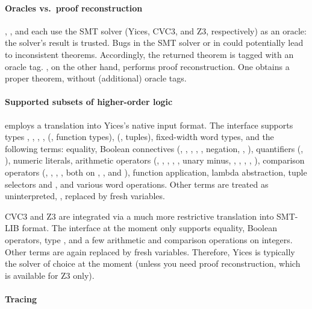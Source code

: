 \paragraph{Oracles vs.\ proof reconstruction}

, , and  each use the
SMT solver (Yices, CVC3, and Z3, respectively) as an oracle: the
solver's result is trusted.  Bugs in the SMT solver or in
 could potentially lead to inconsistent theorems.
Accordingly, the returned theorem is tagged with an oracle
tag. , on the other hand, performs proof reconstruction.
One obtains a proper \HOL{} theorem, without (additional) oracle tags.

\paragraph{Supported subsets of higher-order logic}

 employs a translation into Yices's native input
format.  The interface supports types , ,
, , \holtxt{->} (\ie, function types),
 (\ie, tuples), fixed-width word types, and the following
terms: equality, Boolean connectives (, ,
\holtxt{==>}, \holtxt{/\bs}, \holtxt{\bs /}, negation,
, ), quantifiers (\holtxt{!},
), numeric literals, arithmetic operators (,
\holtxt{+}, \holtxt{-}, \holtxt{*}, \holtxt{/}, unary minus,
, , , , ),
comparison operators (\holtxt{<}, \holtxt{<=}, \holtxt{>},
\holtxt{>=}, both on , , and ),
function application, lambda abstraction, tuple selectors 
and , and various word operations.  Other terms are
treated as uninterpreted, \ie, replaced by fresh variables.

CVC3 and Z3 are integrated via a much more restrictive translation
into SMT-LIB format.  The interface at the moment only supports
equality, Boolean operators, type , and a few arithmetic
and comparison operations on integers.  Other terms are again replaced
by fresh variables.  Therefore, Yices is typically the solver of
choice at the moment (unless you need proof reconstruction, which is
available for Z3 only).

\paragraph{Tracing}

